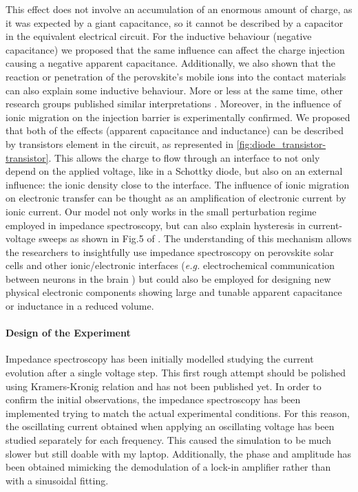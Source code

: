 	This effect does not involve an accumulation of an enormous amount of charge, as it was expected by a giant capacitance, so it cannot be described by a capacitor in the equivalent electrical circuit.
	For the inductive behaviour (negative capacitance) we proposed that the same influence can affect the charge injection causing a negative apparent capacitance.
	Additionally, we also shown that the reaction or penetration of the perovskite's mobile ions into the contact materials can also explain some inductive behaviour.
	More or less at the same time, other research groups published similar interpretations \cite{Jacobs2018,Ebadi2019}.
	Moreover, in  the influence of ionic migration on the injection barrier is experimentally confirmed.
	We proposed that both of the effects (apparent capacitance and inductance) can be described by transistors element in the circuit, as represented in \cref{fig:diode_transistor-transistor}.
	This allows the charge to flow through an interface to not only depend on the applied voltage, like in a Schottky diode, but also on an external influence: the ionic density close to the interface.
	The influence of ionic migration on electronic transfer can be thought as an amplification of electronic current by ionic current.
	Our model not only works in the small perturbation regime employed in impedance spectroscopy, but can also explain hysteresis in current\hyp{}voltage sweeps as shown in Fig.5 of .
	The understanding of this mechanism allows the researchers to insightfully use impedance spectroscopy on perovskite solar cells and other ionic/\-electronic interfaces (\textsl{e.g.} electrochemical communication between neurons in the brain \cite{Cole1956}) but could also be employed for designing new physical electronic components showing large and tunable apparent capacitance or inductance in a reduced volume.

	\paragraph{Design of the Experiment}
	Impedance spectroscopy has been initially modelled studying the current evolution after a single voltage step.
	This first rough attempt should be polished using Kramers\hyp{}Kronig relation and has not been published yet.
	In order to confirm the initial observations, the impedance spectroscopy has been implemented trying to match the actual experimental conditions.
	For this reason, the oscillating current obtained when applying an oscillating voltage has been studied separately for each frequency.
	This caused the simulation to be much slower but still doable with my laptop.
	Additionally, the phase and amplitude has been obtained mimicking the demodulation of a lock-in amplifier rather than with a sinusoidal fitting.

